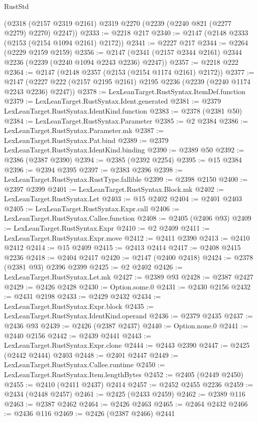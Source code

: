 \begin{lexlean}{RustStd}
\begin{coremodule}
    (@2318 (@2157 @2319 @2161) @2319 @2270 (@2239 (@2240 @821 (@2277 @2279) @2270) @2247))
@2333 := @2218 @217
@2340 := @2147 (@2148 @2333 (@2153 (@2154 @1094 @2161) @2172))
@2341 := @2227 @217
@2344 := @2264 (@2229 @2159 @2159)
@2356 := @2147 (@2341 (@2157 @2344 @2161) @2344 @2236 (@2239 (@2240 @1094 @2243 @2236) @2247))
@2357 := @2218 @222
@2364 := @2147 (@2148 @2357 (@2153 (@2154 @1174 @2161) @2172))
@2377 := @2147 (@2227 @222 (@2157 @2195 @2161) @2195 @2236 (@2239 (@2240 @1174 @2243 @2236) @2247))
@2378 := LexLeanTarget.RustSyntax.ItemDef.function
@2379 := LexLeanTarget.RustSyntax.Ident.generated
@2381 := @2379 LexLeanTarget.RustSyntax.IdentKind.function
@2383 := @2378 (@2381 @50)
@2384 := LexLeanTarget.RustSyntax.Parameter
@2385 := @2 @2384
@2386 := LexLeanTarget.RustSyntax.Parameter.mk
@2387 := LexLeanTarget.RustSyntax.Pat.bind
@2389 := @2379 LexLeanTarget.RustSyntax.IdentKind.binding
@2390 := @2389 @50
@2392 := @2386 (@2387 @2390)
@2394 := @2385 (@2392 @2254)
@2395 := @15 @2384
@2396 := @2394 @2395
@2397 := @2383 @2396
@2398 := LexLeanTarget.RustSyntax.RustType.fallible
@2399 := @2398 @2150
@2400 := @2397 @2399
@2401 := LexLeanTarget.RustSyntax.Block.mk
@2402 := LexLeanTarget.RustSyntax.Let
@2403 := @15 @2402
@2404 := @2401 @2403
@2405 := LexLeanTarget.RustSyntax.Expr.call
@2406 := LexLeanTarget.RustSyntax.Callee.function
@2408 := @2405 (@2406 @93)
@2409 := LexLeanTarget.RustSyntax.Expr
@2410 := @2 @2409
@2411 := LexLeanTarget.RustSyntax.Expr.move
@2412 := @2411 @2390
@2413 := @2410 @2412
@2414 := @15 @2409
@2415 := @2413 @2414
@2417 := @2408 @2415 @2236
@2418 := @2404 @2417
@2420 := @2147 (@2400 @2418)
@2424 := @2378 (@2381 @93) @2396 @2399
@2425 := @2 @2402
@2426 := LexLeanTarget.RustSyntax.Let.mk
@2427 := @2389 @93
@2428 := @2387 @2427
@2429 := @2426 @2428
@2430 := Option.some.{0}
@2431 := @2430 @2156
@2432 := @2431 @2198
@2433 := @2429 @2432
@2434 := LexLeanTarget.RustSyntax.Expr.block
@2435 := LexLeanTarget.RustSyntax.IdentKind.operand
@2436 := @2379 @2435
@2437 := @2436 @93
@2439 := @2426 (@2387 @2437)
@2440 := Option.none.{0}
@2441 := @2440 @2156
@2442 := @2439 @2441
@2443 := LexLeanTarget.RustSyntax.Expr.clone
@2444 := @2443 @2390
@2447 := @2425 (@2442 @2444) @2403
@2448 := @2401 @2447
@2449 := LexLeanTarget.RustSyntax.Callee.runtime
@2450 := LexLeanTarget.RustSyntax.Item.lengthBytes
@2452 := @2405 (@2449 @2450)
@2455 := @2410 (@2411 @2437) @2414
@2457 := @2452 @2455 @2236
@2459 := @2434 (@2448 @2457)
@2461 := @2425 (@2433 @2459)
@2462 := @2389 @116
@2463 := @2387 @2462
@2464 := @2426 @2463
@2465 := @2464 @2432
@2466 := @2436 @116
@2469 := @2426 (@2387 @2466) @2441

\end{coremodule}
\end{lexlean}
